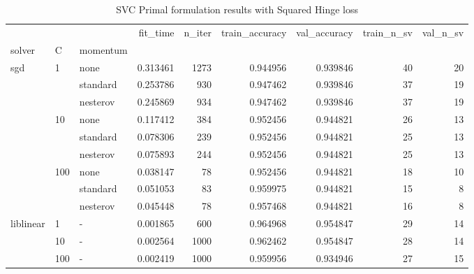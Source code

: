 \begin{table}[H]
\centering
\caption{SVC Primal formulation results with Squared Hinge loss}
\label{primal_svc_squared_hinge_cv_results}
\begin{tabular}{lllrrrrrr}
\toprule
          &     &   &  fit\_time &  n\_iter &  train\_accuracy &  val\_accuracy &  train\_n\_sv &  val\_n\_sv \\
solver & C & momentum &           &         &                 &               &             &           \\
\midrule
sgd & 1   & none &  0.313461 &    1273 &        0.944956 &      0.939846 &          40 &        20 \\
          &     & standard &  0.253786 &     930 &        0.947462 &      0.939846 &          37 &        19 \\
          &     & nesterov &  0.245869 &     934 &        0.947462 &      0.939846 &          37 &        19 \\
          & 10  & none &  0.117412 &     384 &        0.952456 &      0.944821 &          26 &        13 \\
          &     & standard &  0.078306 &     239 &        0.952456 &      0.944821 &          25 &        13 \\
          &     & nesterov &  0.075893 &     244 &        0.952456 &      0.944821 &          25 &        13 \\
          & 100 & none &  0.038147 &      78 &        0.952456 &      0.944821 &          18 &        10 \\
          &     & standard &  0.051053 &      83 &        0.959975 &      0.944821 &          15 &         8 \\
          &     & nesterov &  0.045448 &      78 &        0.957468 &      0.944821 &          16 &         8 \\
liblinear & 1   & - &  0.001865 &     600 &        0.964968 &      0.954847 &          29 &        14 \\
          & 10  & - &  0.002564 &    1000 &        0.962462 &      0.954847 &          28 &        14 \\
          & 100 & - &  0.002419 &    1000 &        0.959956 &      0.934946 &          27 &        15 \\
\bottomrule
\end{tabular}
\end{table}

